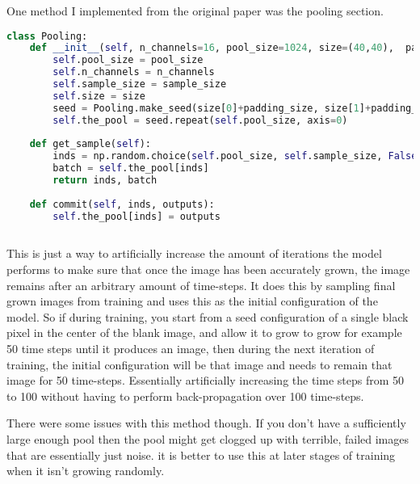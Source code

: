One method I implemented from the original paper was the pooling section. 
\begin{lstlisting}[language=Python]
class Pooling:
	def __init__(self, n_channels=16, pool_size=1024, size=(40,40),  padding_size=16, sample_size=8):
		self.pool_size = pool_size
		self.n_channels = n_channels
		self.sample_size = sample_size
		self.size = size
		seed = Pooling.make_seed(size[0]+padding_size, size[1]+padding_size, self.n_channels)
		self.the_pool = seed.repeat(self.pool_size, axis=0)
	
	def get_sample(self):
		inds = np.random.choice(self.pool_size, self.sample_size, False)
		batch = self.the_pool[inds]
		return inds, batch
	
	def commit(self, inds, outputs):
		self.the_pool[inds] = outputs
		   
\end{lstlisting}
This is just a way to artificially increase the amount of iterations the model performs to make sure that once the image has been accurately grown, the image remains after an arbitrary amount of time-steps. It does this by sampling final grown images from training and uses this as the initial configuration of the model. So if during training, you start from a seed configuration of a single black pixel in the center of the blank image, and allow it to grow to grow for example 50 time steps until it produces an image, then during the next iteration of training, the initial configuration will be that image and needs to remain that image for 50 time-steps. Essentially artificially increasing the time steps from 50 to 100 without having to perform back-propagation over 100 time-steps.

There were some issues with this method though. If you don't have a sufficiently large enough pool then the pool might get clogged up with terrible, failed images that are essentially just noise. it is better to use this at later stages of training when it isn't growing randomly.